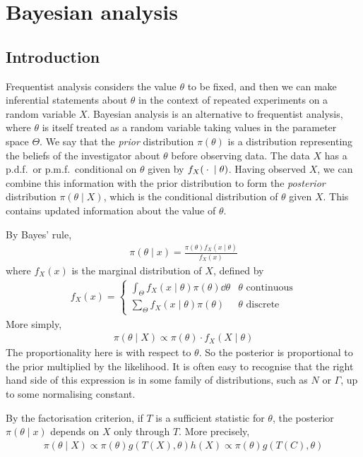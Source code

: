 \section{Bayesian analysis}

\subsection{Introduction}
Frequentist analysis considers the value $\theta$ to be fixed, and then we can make inferential statements about $\theta$ in the context of repeated experiments on a random variable $X$.
Bayesian analysis is an alternative to frequentist analysis, where $\theta$ is itself treated as a random variable taking values in the parameter space $\Theta$.
We say that the \textit{prior} distribution $\pi(\theta)$ is a distribution representing the beliefs of the investigator about $\theta$ before observing data.
The data $X$ has a p.d.f.\ or p.m.f.\ conditional on $\theta$ given by $f_X({}\cdot{} \mid \theta)$.
Having observed $X$, we can combine this information with the prior distribution to form the \textit{posterior} distribution $\pi(\theta \mid X)$, which is the conditional distribution of $\theta$ given $X$.
This contains updated information about the value of $\theta$.

By Bayes' rule,
\begin{align*}
	\pi(\theta \mid x) = \frac{\pi(\theta) f_X(x \mid \theta)}{f_X(x)}
\end{align*}
where $f_X(x)$ is the marginal distribution of $X$, defined by
\begin{align*}
	f_X(x) = \begin{cases}
		\int_\Theta f_X(x\mid\theta) \pi(\theta) \dd{\theta} & \theta \text{ continuous} \\
		\sum_\Theta f_X(x\mid\theta) \pi(\theta)             & \theta \text{ discrete}
	\end{cases}
\end{align*}
More simply,
\begin{align*}
	\pi(\theta \mid X) \propto \pi(\theta) \cdot f_X(X \mid \theta)
\end{align*}
The proportionality here is with respect to $\theta$.
So the posterior is proportional to the prior multiplied by the likelihood.
It is often easy to recognise that the right hand side of this expression is in some family of distributions, such as $N$ or $\Gamma$, up to some normalising constant.
\begin{remark}
	By the factorisation criterion, if $T$ is a sufficient statistic for $\theta$, the posterior $\pi(\theta \mid x)$ depends on $X$ only through $T$.
	More precisely,
	\begin{align*}
		\pi(\theta \mid X) \propto \pi(\theta) g(T(X),\theta) h(X) \propto \pi(\theta) g(T(C),\theta)
	\end{align*}
\end{remark}


